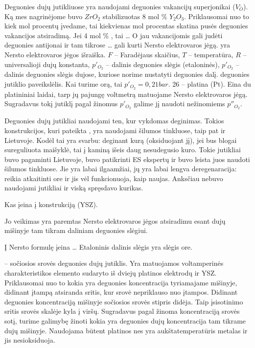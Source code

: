 Deguonies dujų jutikliuose yra naudojami deguonies vakancijų
superjonikai ($V_{O}^{..}$). Ką mes nagrinėjome buvo
$ZrO_{2}$ stabilizuotas 8 mol \% $Y_{2}O_{3}$. Priklausomai nuo
to kiek mol procentų įvedame, tai kiekvienas mol procentas skatina
pusės deguonies vakancijos atsiradimą. Jei 4 mol \% , tai …
O jau vakancijomis gali judėti deguonies antijonai ir tam tikrose
… gali kurti Nersto elektrovaros jėgą.  yra Nersto
elektrovaros jėgos išraiška. $F$ – Faradėjaus skaičius, $T$ – temperatūra,
$R$ – universalioji dujų konstanta, $p'_{O_{2}}$ – dalinis deguonies
slėgis (etaloninės), $p'_{O_{2}}$ – dalinis deguonies slėgis dujose,
kuriose norime nustatyti deguonies dalį.  deguonies jutiklio
paveikslėlis. Kai turime orą, tai $p'_{O_{2}} = 0,21 bar$.
26 – platina (Pt). Eina du platininiai laidai, tarp jų pajungę voltmetrą
matuojame Nersto elektrovaros jėgą. Sugradavus tokį jutiklį pagal žinomus
$p'_{O_{2}}$ galime jį naudoti nežinomiems $p''_{O_2}$.

Deguonies dujų jutikliai naudojami ten, kur vykdomas deginimas. Tokios
konstrukcijos, kuri pateikta , yra naudojami šilumos
tinkluose, taip pat ir Lietuvoje. Kodėl tai yra svarbu: deginant kurą
(oksiduojant jį), jei bus blogai sureguliuota maišyklė, tai į kaminą
išeis daug nesudegusio kuro. Tokie jutikliai buvo pagaminti Lietuvoje,
buvo patikrinti ES ekspertų ir buvo leista juos naudoti šilumos tinkluose.
Jie yra labai ilgaamžiai, jų yra labai lengva deregenaracija: reikia
atkaitinti ore ir jis vėl funkcionuoja, kaip naujas. Anksčiau nebuvo
naudojami jutikliai ir viską spręsdavo kurikas.

\begin{remember}
  \item Kas įeina į konstrukciją (YSZ).
  \item Jo veikimas yra paremtas Nersto elektrovaros jėgos atsiradimu
    esant dujų mišinyje tam tikram daliniam deguonies slėgiui.
  \item Į Nersto formulę įeina …
    Etaloninis dalinis slėgis yra slėgis ore.
\end{remember}

 – sočiosios srovės deguonies dujų jutiklis. Yra
matuojamos voltamperinės charakteristikos elemento sudaryto iš dviejų
platinos elektrodų ir YSZ. Priklausomai nuo to kokia yra deguonies
koncentracija tyriamajame mišinyje, didinant įtampą atsiranda sritis,
kur srovė nepriklauso nuo įtampos. Didinant deguonies koncentraciją
mišinyje sočiosios srovės stipris didėja. Taip įsisotinimo sritis
srovės skalėje kyla į viršų. Sugradavus pagal žinoma
koncentraciją srovės sotį, turime galimybę žinoti kokia yra
deguonies dujų koncentracija tam tikrame dujų mišinyje.
Naudojama būtent platinos nes yra aukštatemperatūris metalas ir
jis nesioksiduoja.

